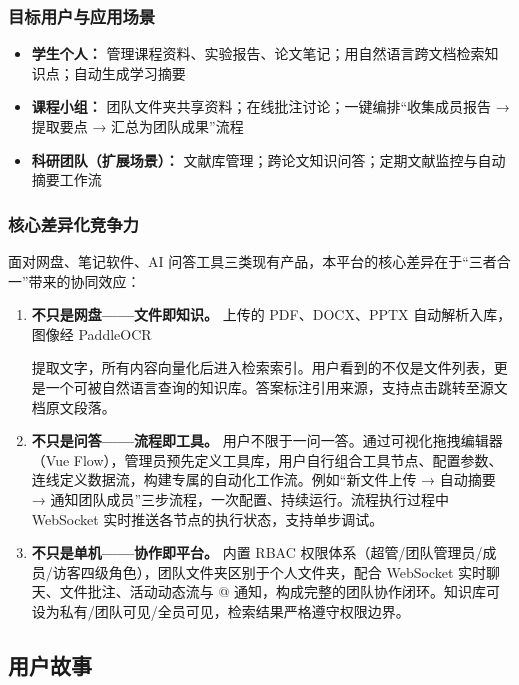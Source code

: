 \documentclass[a4paper,zihao=-4]{ctexart}
\begin{document}
\subsubsection{目标用户与应用场景}

\begin{itemize}
  \item \textbf{学生个人：} 管理课程资料、实验报告、论文笔记；用自然语言跨文档检索知识点；自动生成学习摘要
  \item \textbf{课程小组：} 团队文件夹共享资料；在线批注讨论；一键编排“收集成员报告 → 提取要点 → 汇总为团队成果”流程
  \item \textbf{科研团队（扩展场景）：} 文献库管理；跨论文知识问答；定期文献监控与自动摘要工作流
\end{itemize}

\subsubsection{核心差异化竞争力}

面对网盘、笔记软件、AI 问答工具三类现有产品，本平台的核心差异在于“三者合一”带来的协同效应：

\begin{enumerate}
  \item \textbf{不只是网盘——文件即知识。} 上传的 PDF、DOCX、PPTX 自动解析入库，图像经 PaddleOCR

        提取文字，所有内容向量化后进入检索索引。用户看到的不仅是文件列表，更是一个可被自然语言查询的知识库。答案标注引用来源，支持点击跳转至源文档原文段落。
  \item \textbf{不只是问答——流程即工具。} 用户不限于一问一答。通过可视化拖拽编辑器（Vue
        Flow），管理员预先定义工具库，用户自行组合工具节点、配置参数、连线定义数据流，构建专属的自动化工作流。例如“新文件上传 →
        自动摘要 →
        通知团队成员”三步流程，一次配置、持续运行。流程执行过程中 WebSocket 实时推送各节点的执行状态，支持单步调试。
  \item \textbf{不只是单机——协作即平台。} 内置 RBAC
        权限体系（超管/团队管理员/成员/访客四级角色），团队文件夹区别于个人文件夹，配合 WebSocket
        实时聊天、文件批注、活动动态流与 @
        通知，构成完整的团队协作闭环。知识库可设为私有/团队可见/全员可见，检索结果严格遵守权限边界。
\end{enumerate}

\subsection{用户故事}
\end{document}
